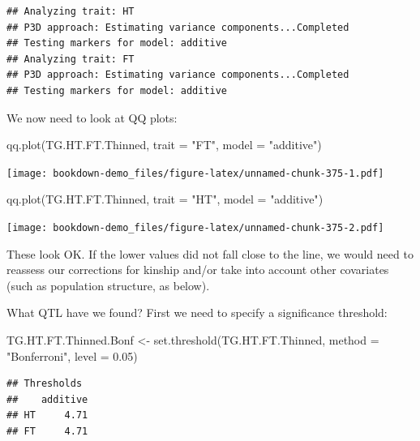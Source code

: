 \documentclass[
]{book}
\newenvironment{Shaded}{\begin{snugshade}}{\end{snugshade}}
\newcommand{\AttributeTok}[1]{\textcolor[rgb]{0.77,0.63,0.00}{#1}}
\newcommand{\FloatTok}[1]{\textcolor[rgb]{0.00,0.00,0.81}{#1}}
\newcommand{\FunctionTok}[1]{\textcolor[rgb]{0.00,0.00,0.00}{#1}}
\newcommand{\NormalTok}[1]{#1}
\newcommand{\OtherTok}[1]{\textcolor[rgb]{0.56,0.35,0.01}{#1}}
\newcommand{\StringTok}[1]{\textcolor[rgb]{0.31,0.60,0.02}{#1}}
\begin{document}
\begin{verbatim}
## Analyzing trait: HT 
## P3D approach: Estimating variance components...Completed 
## Testing markers for model: additive 
## Analyzing trait: FT 
## P3D approach: Estimating variance components...Completed 
## Testing markers for model: additive
\end{verbatim}

We now need to look at QQ plots:

\begin{Shaded}
\begin{Highlighting}[]
\FunctionTok{qq.plot}\NormalTok{(TG.HT.FT.Thinned, }\AttributeTok{trait =} \StringTok{"FT"}\NormalTok{, }\AttributeTok{model =} \StringTok{"additive"}\NormalTok{)}
\end{Highlighting}
\end{Shaded}

\texttt{[image: bookdown-demo\_files/figure-latex/unnamed-chunk-375-1.pdf]}

\begin{Shaded}
\begin{Highlighting}[]
\FunctionTok{qq.plot}\NormalTok{(TG.HT.FT.Thinned, }\AttributeTok{trait =} \StringTok{"HT"}\NormalTok{, }\AttributeTok{model =} \StringTok{"additive"}\NormalTok{)}
\end{Highlighting}
\end{Shaded}

\texttt{[image: bookdown-demo\_files/figure-latex/unnamed-chunk-375-2.pdf]}

These look OK. If the lower values did not fall close to the line, we would need to reassess our corrections for kinship and/or take into account other covariates (such as population structure, as below).

What QTL have we found? First we need to specify a significance threshold:

\begin{Shaded}
\begin{Highlighting}[]
\NormalTok{TG.HT.FT.Thinned.Bonf }\OtherTok{\textless{}{-}} \FunctionTok{set.threshold}\NormalTok{(TG.HT.FT.Thinned, }\AttributeTok{method =} \StringTok{"Bonferroni"}\NormalTok{, }
    \AttributeTok{level =} \FloatTok{0.05}\NormalTok{)}
\end{Highlighting}
\end{Shaded}

\begin{verbatim}
## Thresholds
##    additive
## HT     4.71
## FT     4.71
\end{verbatim}
\end{document}
